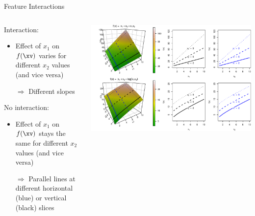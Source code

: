 \documentclass[11pt,compress,t,notes=noshow, aspectratio=169, xcolor=table]{beamer}
\begin{document}
\begin{frame}{Feature Interactions}

\begin{columns}[c, totalwidth=\textwidth]
\begin{column}{0.3\textwidth}
Interaction:
\begin{itemize}
	\item Effect of $x_1$ on $f(\xv)$ varies for different $x_2$ values (and vice versa)
	\item[$\Rightarrow$] Different slopes
\end{itemize}

\vspace{20pt}

No interaction:
\begin{itemize}
	\item Effect of $x_1$ on $f(\xv)$ stays the same for different $x_2$ values (and vice versa)
	\item[$\Rightarrow$] Parallel lines at different horizontal (blue) or vertical (black) slices
\end{itemize}

\end{column}
\begin{column}{0.7\textwidth}
	\includegraphics[width = \textwidth]{figure/interaction_separable}
\end{column}
\end{columns}

\end{frame}
\end{document}
